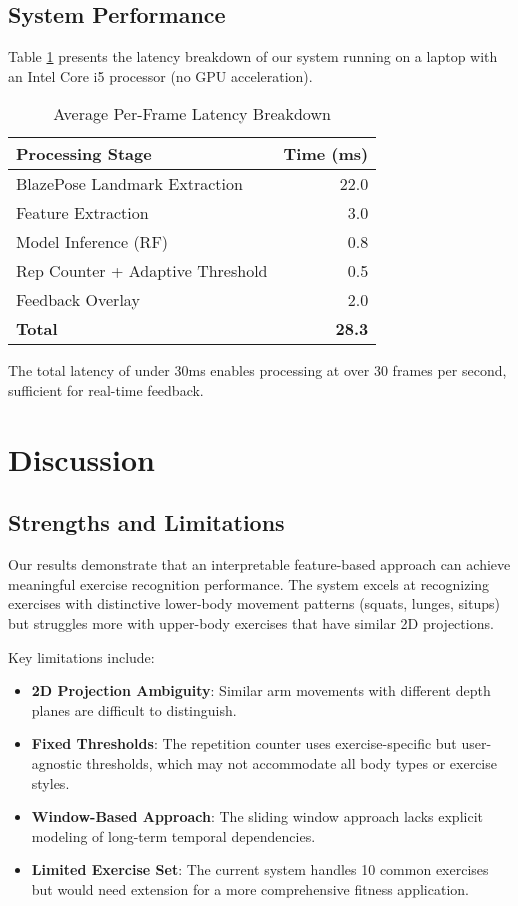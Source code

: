 \documentclass[conference]{IEEEtran}
\begin{document}
\subsection{System Performance}
Table \ref{tab:latency} presents the latency breakdown of our system running on a laptop with an Intel Core i5 processor (no GPU acceleration).

\begin{table}[ht]
\caption{Average Per-Frame Latency Breakdown}
\label{tab:latency}
\centering
\begin{tabular}{lr}
\toprule
\textbf{Processing Stage} & \textbf{Time (ms)} \\
\midrule
BlazePose Landmark Extraction & 22.0 \\
Feature Extraction & 3.0 \\
Model Inference (RF) & 0.8 \\
Rep Counter + Adaptive Threshold & 0.5 \\
Feedback Overlay & 2.0 \\
\midrule
\textbf{Total} & \textbf{28.3} \\
\bottomrule
\end{tabular}
\end{table}

The total latency of under 30ms enables processing at over 30 frames per second, sufficient for real-time feedback.

\section{Discussion}

\subsection{Strengths and Limitations}
Our results demonstrate that an interpretable feature-based approach can achieve meaningful exercise recognition performance. The system excels at recognizing exercises with distinctive lower-body movement patterns (squats, lunges, situps) but struggles more with upper-body exercises that have similar 2D projections.

Key limitations include:
\begin{itemize}
    \item \textbf{2D Projection Ambiguity}: Similar arm movements with different depth planes are difficult to distinguish.
    \item \textbf{Fixed Thresholds}: The repetition counter uses exercise-specific but user-agnostic thresholds, which may not accommodate all body types or exercise styles.
    \item \textbf{Window-Based Approach}: The sliding window approach lacks explicit modeling of long-term temporal dependencies.
    \item \textbf{Limited Exercise Set}: The current system handles 10 common exercises but would need extension for a more comprehensive fitness application.
\end{itemize}
\end{document}
